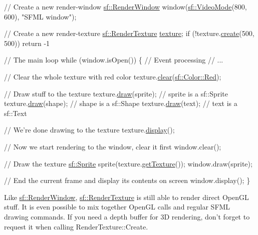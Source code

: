 \begin{DoxyCode}
\textcolor{comment}{// Create a new render-window}
\hyperlink{classsf_1_1_render_window}{sf::RenderWindow} window(\hyperlink{classsf_1_1_video_mode}{sf::VideoMode}(800, 600), \textcolor{stringliteral}{"SFML window"});

\textcolor{comment}{// Create a new render-texture}
\hyperlink{classsf_1_1_render_texture}{sf::RenderTexture} \hyperlink{gl3_8h_ab21590c4736d1459a5a0674a42b5a655}{texture};
\textcolor{keywordflow}{if} (!texture.\hyperlink{classsf_1_1_render_texture_aefbb76eb3b87e368ab974b2660931ccb}{create}(500, 500))
    \textcolor{keywordflow}{return} -1

\textcolor{comment}{// The main loop}
\textcolor{keywordflow}{while} (window.isOpen())
\{
   \textcolor{comment}{// Event processing}
   \textcolor{comment}{// ...}

   \textcolor{comment}{// Clear the whole texture with red color}
   texture.\hyperlink{classsf_1_1_render_target_a6bb6f0ba348f2b1e2f46114aeaf60f26}{clear}(\hyperlink{classsf_1_1_color_a127dbf55db9c07d0fa8f4bfcbb97594a}{sf::Color::Red});

   \textcolor{comment}{// Draw stuff to the texture}
   texture.\hyperlink{classsf_1_1_render_target_a12417a3bcc245c41d957b29583556f39}{draw}(sprite);  \textcolor{comment}{// sprite is a sf::Sprite}
   texture.\hyperlink{classsf_1_1_render_target_a12417a3bcc245c41d957b29583556f39}{draw}(shape);   \textcolor{comment}{// shape is a sf::Shape}
   texture.\hyperlink{classsf_1_1_render_target_a12417a3bcc245c41d957b29583556f39}{draw}(text);    \textcolor{comment}{// text is a sf::Text}

   \textcolor{comment}{// We're done drawing to the texture}
   texture.\hyperlink{classsf_1_1_render_texture_af92886d5faef3916caff9fa9ab32c555}{display}();

   \textcolor{comment}{// Now we start rendering to the window, clear it first}
   window.clear();

   \textcolor{comment}{// Draw the texture}
   \hyperlink{classsf_1_1_sprite}{sf::Sprite} sprite(texture.\hyperlink{classsf_1_1_render_texture_a95bc5152c497066d31fdc57da8e17678}{getTexture}());
   window.draw(sprite);

   \textcolor{comment}{// End the current frame and display its contents on screen}
   window.display();
\}
\end{DoxyCode}


Like \hyperlink{classsf_1_1_render_window}{sf\-::\-Render\-Window}, \hyperlink{classsf_1_1_render_texture}{sf\-::\-Render\-Texture} is still able to render direct Open\-G\-L stuff. It is even possible to mix together Open\-G\-L calls and regular S\-F\-M\-L drawing commands. If you need a depth buffer for 3\-D rendering, don't forget to request it when calling Render\-Texture\-::\-Create.

